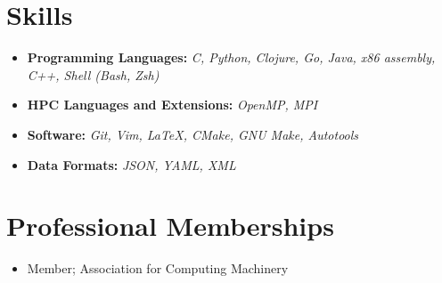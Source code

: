\documentclass[10pt,letterpaper,sans]{moderncv}
\begin{document}
\section{Skills}

\vspace{2pt}

\begin{itemize}

    \item{
        \textbf{Programming Languages:}
        \textit{
            C, Python, Clojure, Go, Java,  x86 assembly, C++, Shell (Bash, Zsh)
        }
    }
    \vspace{3pt}
    \item{
        \textbf{HPC Languages and Extensions:}
        \textit{
            OpenMP, MPI
        }
    }
    \vspace{3pt}
    \item{
        \textbf{Software:}
        \textit{
            Git, Vim, \LaTeX, CMake, GNU Make, Autotools
        }
    }
    \vspace{3pt}
    \item {
        \textbf{Data Formats:}
        \textit{
            JSON, YAML, XML
        }
    }
\end{itemize}

\section{Professional Memberships}
\begin{itemize}
    \item {
            Member; Association for Computing Machinery
    }
\end{itemize}
\end{document}
